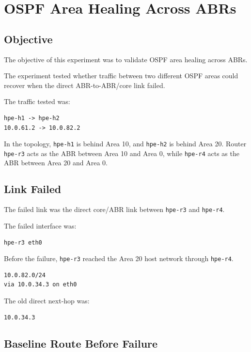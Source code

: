 \section{OSPF Area Healing Across ABRs}

\subsection{Objective}

The objective of this experiment was to validate OSPF area healing across ABRs.

The experiment tested whether traffic between two different OSPF areas could recover when the direct ABR-to-ABR/core link failed.

The traffic tested was:

\begin{verbatim}
hpe-h1 -> hpe-h2
10.0.61.2 -> 10.0.82.2
\end{verbatim}

In the topology, \texttt{hpe-h1} is behind Area 10, and \texttt{hpe-h2} is behind Area 20. Router \texttt{hpe-r3} acts as the ABR between Area 10 and Area 0, while \texttt{hpe-r4} acts as the ABR between Area 20 and Area 0.

\subsection{Link Failed}

The failed link was the direct core/ABR link between \texttt{hpe-r3} and \texttt{hpe-r4}.

The failed interface was:

\begin{verbatim}
hpe-r3 eth0
\end{verbatim}

Before the failure, \texttt{hpe-r3} reached the Area 20 host network through \texttt{hpe-r4}.

\begin{verbatim}
10.0.82.0/24
via 10.0.34.3 on eth0
\end{verbatim}

The old direct next-hop was:

\begin{verbatim}
10.0.34.3
\end{verbatim}

\subsection{Baseline Route Before Failure}

